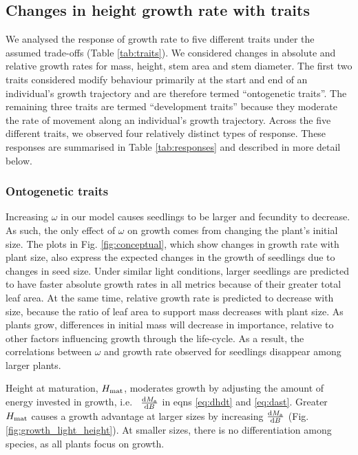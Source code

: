 \documentclass[9pt,twocolumn,twoside]{pnas-new}
\begin{document}
\subsection{Changes in height growth rate with traits}

We analysed the response of growth rate to five different traits under the assumed trade-offs (Table \ref{tab:traits}). We considered changes in absolute and relative growth rates for mass, height, stem area and stem diameter. The first two traits considered modify behaviour primarily at the start and end of an individual's growth trajectory and are therefore termed ``ontogenetic traits''. The remaining three traits are termed ``development traits'' because they moderate the rate of movement along an individual's growth trajectory. Across the five different traits, we observed four relatively distinct types of response. These responses are summarised in Table \ref{tab:responses} and described in more detail below.

\subsubsection{Ontogenetic traits}  Increasing $\omega$ in our model causes seedlings to be larger and fecundity to decrease. As such, the only effect of $\omega$ on growth comes from changing the plant's initial size. The plots in Fig. \ref{fig:conceptual}, which show changes in growth rate with plant size, also express the expected changes in the growth of seedlings due to changes in seed size. Under similar light conditions, larger seedlings are predicted to have faster absolute growth rates in all metrics because of their greater total leaf area. At the same time, relative growth rate is predicted to decrease with size, because the ratio of leaf area to support mass decreases with plant size. As plants grow, differences in initial mass will decrease in importance, relative to other factors influencing growth through the life-cycle. As a result, the correlations between $\omega$ and growth rate observed for seedlings disappear among larger plants.

Height at maturation, $H_{{\rm mat}}$, moderates growth by adjusting the amount of energy invested in growth, i.e.~ $\frac{{\rm d}M_{\rm a}}{{\rm d}B}$ in eqns \ref{eq:dhdt} and \ref{eq:dast}. Greater $H_{{\rm mat}}$ causes a growth advantage at larger sizes by increasing $\frac{{\rm d}M_{\rm a}}{{\rm d}B}$ (Fig. \ref{fig:growth_light_height}). At smaller sizes, there is no differentiation among species, as all plants focus on growth.
\end{document}
